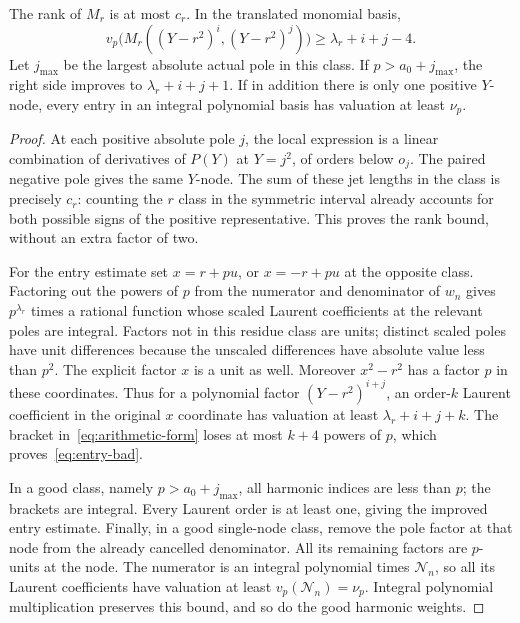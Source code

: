 \begin{lemma}\label{lem:local-entry}
The rank of $M_r$ is at most $c_r$.  In the translated monomial basis,
\begin{equation}\label{eq:entry-bad}
 v_p\bigl(M_r((Y-r^2)^i,(Y-r^2)^j)\bigr)
       \ge\lambda_r+i+j-4.
\end{equation}
Let $j_{\max}$ be the largest absolute actual pole in this class.
If $p>a_0+j_{\max}$, the right side improves to
$\lambda_r+i+j+1$.  If in addition there is only one positive
$Y$-node, every entry in an integral polynomial basis has valuation
at least $\nu_p$.
\end{lemma}
\begin{proof}
At each positive absolute pole $j$, the local expression is a linear
combination of derivatives of $P(Y)$ at $Y=j^2$, of orders below $o_j$.
The paired negative pole gives the same $Y$-node.  The sum of these
jet lengths in the class is precisely $c_r$: counting the $r$ class
in the symmetric interval already accounts for both possible signs
of the positive representative.  This proves the rank bound, without
an extra factor of two.

For the entry estimate set $x=r+pu$, or $x=-r+pu$ at the opposite
class.  Factoring out the powers of $p$ from the numerator and
denominator of $w_n$ gives $p^{\lambda_r}$ times a rational function
whose scaled Laurent coefficients at the relevant poles are integral.
Factors not in this residue class are units; distinct scaled poles
have unit differences because the unscaled differences have absolute
value less than $p^2$.  The explicit factor $x$ is a unit as well.
Moreover $x^2-r^2$ has a factor $p$ in these coordinates.
Thus for a polynomial factor $(Y-r^2)^{i+j}$, an order-$k$ Laurent
coefficient in the original $x$ coordinate has valuation at least
$\lambda_r+i+j+k$.  The bracket in~\eqref{eq:arithmetic-form}
loses at most $k+4$ powers of $p$, which proves~\eqref{eq:entry-bad}.

In a good class, namely $p>a_0+j_{\max}$, all harmonic indices are
less than $p$; the brackets are integral.  Every Laurent order is at
least one, giving the improved entry estimate.  Finally, in a good
single-node class, remove the pole factor at that node from the
already cancelled denominator.  All its remaining factors are
$p$-units at the node.  The numerator is an integral polynomial times
$\mathcal N_n$, so all its Laurent coefficients have valuation at
least $v_p(\mathcal N_n)=\nu_p$.  Integral polynomial multiplication
preserves this bound, and so do the good harmonic weights.
\end{proof}

